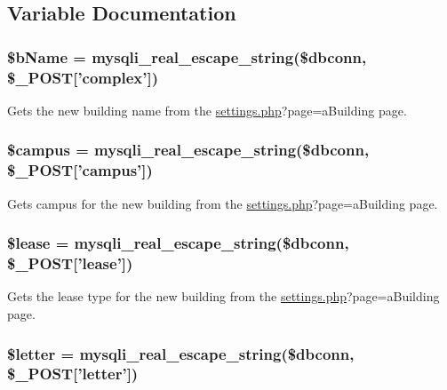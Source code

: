 \subsection{\-Variable \-Documentation}
\hypertarget{buildingVal_8php_adda32c78f7f7aed9a0f7bb03a9198e9c}{
\subsubsection[{\$b\-Name}]{\setlength{\rightskip}{0pt plus 5cm}\$b\-Name = mysqli\-\_\-real\-\_\-escape\-\_\-string(\$dbconn, \$\-\_\-\-P\-O\-S\-T\mbox{[}'complex'\mbox{]})}}\label{buildingVal_8php_adda32c78f7f7aed9a0f7bb03a9198e9c}
\-Gets the new building name from the \hyperlink{settings_8php}{settings.\-php}?page=a\-Building page. \hypertarget{buildingVal_8php_a6f0655994f3941d6ab50f681032f899b}{
\subsubsection[{\$campus}]{\setlength{\rightskip}{0pt plus 5cm}\$campus = mysqli\-\_\-real\-\_\-escape\-\_\-string(\$dbconn, \$\-\_\-\-P\-O\-S\-T\mbox{[}'campus'\mbox{]})}}\label{buildingVal_8php_a6f0655994f3941d6ab50f681032f899b}
\-Gets campus for the new building from the \hyperlink{settings_8php}{settings.\-php}?page=a\-Building page. \hypertarget{buildingVal_8php_ae95126b1133cf958aaf8a31b0283364c}{
\subsubsection[{\$lease}]{\setlength{\rightskip}{0pt plus 5cm}\$lease = mysqli\-\_\-real\-\_\-escape\-\_\-string(\$dbconn, \$\-\_\-\-P\-O\-S\-T\mbox{[}'lease'\mbox{]})}}\label{buildingVal_8php_ae95126b1133cf958aaf8a31b0283364c}
\-Gets the lease type for the new building from the \hyperlink{settings_8php}{settings.\-php}?page=a\-Building page. \hypertarget{buildingVal_8php_a5f9c1e96bbb9e8e9cbb49a18f0412f58}{
\subsubsection[{\$letter}]{\setlength{\rightskip}{0pt plus 5cm}\$letter = mysqli\-\_\-real\-\_\-escape\-\_\-string(\$dbconn, \$\-\_\-\-P\-O\-S\-T\mbox{[}'letter'\mbox{]})}}\label{buildingVal_8php_a5f9c1e96bbb9e8e9cbb49a18f0412f58}
